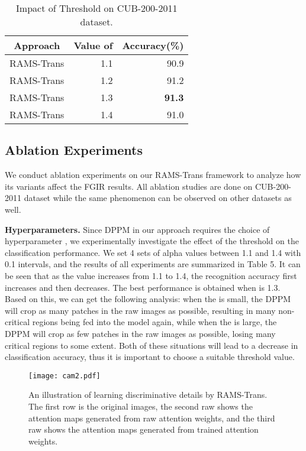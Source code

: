\documentclass[sigconf]{acmart}
\begin{document}
\begin{table}[h]
\caption{Impact of Threshold  on CUB-200-2011 dataset.}
\begin{center}
\begin{tabular}{c|rr}
\hline
Approach
&\multicolumn{1}{c}{Value of }
&\multicolumn{1}{c}{Accuracy(\%)}
\\
\hline
RAMS-Trans & 1.1 & 90.9\\
RAMS-Trans & 1.2 & 91.2\\
RAMS-Trans & 1.3 & \textbf{91.3}\\
RAMS-Trans & 1.4 & 91.0\\
\hline
\end{tabular}
\end{center}
\label{tab_base_model}
\end{table}

\subsection{Ablation Experiments}
We conduct ablation experiments on our RAMS-Trans framework to analyze how its variants affect the FGIR results. All ablation studies are done on CUB-200-2011 dataset while the same phenomenon can be observed on other datasets as well.

\textbf{Hyperparameters.} Since DPPM in our approach requires the choice of hyperparameter , we experimentally investigate the effect of the threshold  on the classification performance. We set 4 sets of alpha values between 1.1 and 1.4 with 0.1 intervals, and the results of all experiments are summarized in Table 5. It can be seen that as the  value increases from 1.1 to 1.4, the recognition accuracy first increases and then decreases. The best performance is obtained when  is 1.3. Based on this, we can get the following analysis: when the  is small, the DPPM will crop as many patches in the raw images as possible, resulting in many non-critical regions being fed into the model again, while when the  is large, the DPPM will crop as few patches in the raw images as possible, losing many critical regions to some extent. Both of these situations will lead to a decrease in classification accuracy, thus it is important to choose a suitable threshold value.

\begin{figure}[h]
\centering
\texttt{[image: cam2.pdf]}
\caption{An illustration of learning discriminative details by RAMS-Trans. The first row is the original images, the second raw shows the attention maps generated from raw attention weights, and the third raw shows the attention maps generated from trained attention weights.}
\end{figure}
\end{document}
